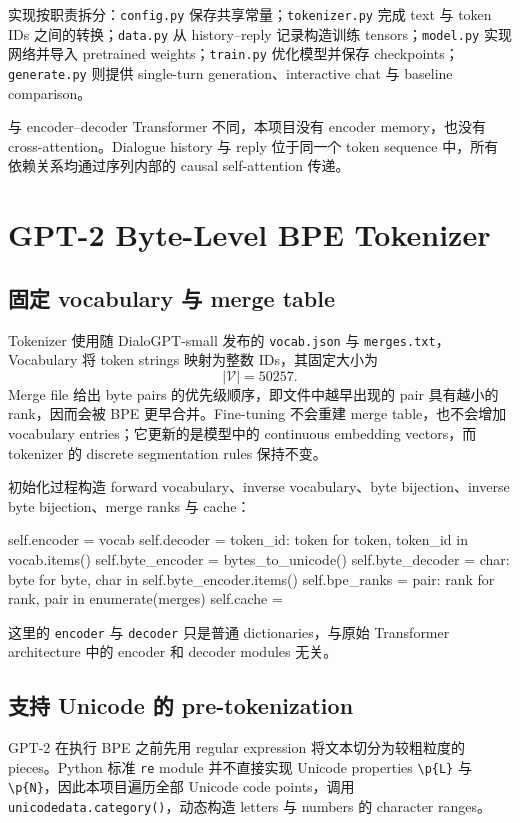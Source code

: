 \documentclass[12pt]{article}
\newcommand{\Vocab}{\mathcal V}
\begin{document}
实现按职责拆分：\texttt{config.py} 保存共享常量；\texttt{tokenizer.py} 完成 text 与 token IDs 之间的转换；\texttt{data.py} 从 history--reply 记录构造训练 tensors；\texttt{model.py} 实现网络并导入 pretrained weights；\texttt{train.py} 优化模型并保存 checkpoints；\texttt{generate.py} 则提供 single-turn generation、interactive chat 与 baseline comparison。

与 encoder--decoder Transformer 不同，本项目没有 encoder memory，也没有 cross-attention。Dialogue history 与 reply 位于同一个 token sequence 中，所有依赖关系均通过序列内部的 causal self-attention 传递。

\section{GPT-2 Byte-Level BPE Tokenizer}

\subsection{固定 vocabulary 与 merge table}

Tokenizer 使用随 DialoGPT-small 发布的 \texttt{vocab.json} 与 \texttt{merges.txt}，Vocabulary 将 token strings 映射为整数 IDs，其固定大小为
\[
|\Vocab|=50257.
\]
Merge file 给出 byte pairs 的优先级顺序，即文件中越早出现的 pair 具有越小的 rank，因而会被 BPE 更早合并。Fine-tuning 不会重建 merge table，也不会增加 vocabulary entries；它更新的是模型中的 continuous embedding vectors，而 tokenizer 的 discrete segmentation rules 保持不变。

初始化过程构造 forward vocabulary、inverse vocabulary、byte bijection、inverse byte bijection、merge ranks 与 cache：
\begin{pythoncode}[label={lst:tokenizer-init}]
self.encoder = vocab
self.decoder = {token_id: token for token, token_id in vocab.items()}
self.byte_encoder = bytes_to_unicode()
self.byte_decoder = {
    char: byte for byte, char in self.byte_encoder.items()
}
self.bpe_ranks = {pair: rank for rank, pair in enumerate(merges)}
self.cache = {}
\end{pythoncode}
这里的 \texttt{encoder} 与 \texttt{decoder} 只是普通 dictionaries，与原始 Transformer architecture 中的 encoder 和 decoder modules 无关。

\subsection{支持 Unicode 的 pre-tokenization}

GPT-2 在执行 BPE 之前先用 regular expression 将文本切分为较粗粒度的 pieces。Python 标准 \texttt{re} module 并不直接实现 Unicode properties \texttt{\textbackslash p\{L\}} 与 \texttt{\textbackslash p\{N\}}，因此本项目遍历全部 Unicode code points，调用 \texttt{unicodedata.category()}，动态构造 letters 与 numbers 的 character ranges。
\end{document}
